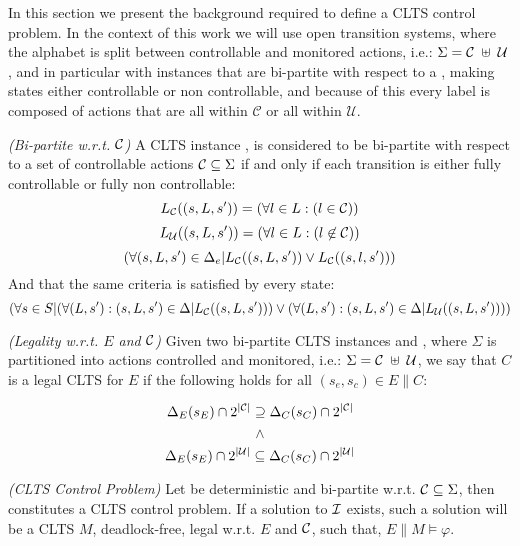 In this section we present the background required to define a CLTS control problem.  In the context of this work we will use open transition systems, where the alphabet is split between controllable and monitored actions, i.e.: $\Sigma=\mathcal{C} \; \uplus \;\mathcal{U}$, and in particular with instances that are bi-partite with respect to a \controlSet, making states either controllable or non controllable, and because of this every label is composed of actions that are all within $\mathcal{C}$ or all within $\mathcal{U}$. 

\begin{definition}\label{def:bi-partite_clts} \emph{(Bi-partite w.r.t. $\mathcal{C}$)} 
A CLTS instance \cltsDef, is considered to be bi-partite with respect to a set of controllable actions $\mathcal{C} \subseteq \Sigma$ if and only if each transition is either fully controllable or fully non controllable:
\[ L_{\mathcal{C}}((s,L,s'))= ( \forall l \in L:(l \in \mathcal{C}))\]
\[ L_{\mathcal{U}}((s,L,s'))= ( \forall l \in L:(l \not\in \mathcal{C}))\]
\[ (\forall (s,L,s') \in \Delta_e| L_{\mathcal{C}}((s,L,s')) \vee L_{\mathcal{C}}((s,l,s'))) \]
And that the same criteria is satisfied by every state:
\[ (\forall s \in S | (\forall (L, s'): (s,L,s') \in \Delta|L_{\mathcal{C}}((s,L,s')))\vee (\forall (L, s'): (s,L,s') \in \Delta|L_{\mathcal{U}}((s,L,s'))))\]
\end{definition}

\begin{definition}
	\label{def:legal_clts} \emph{(Legality w.r.t. $E$ and $\mathcal{C}$)} 
	Given two bi-partite CLTS instances  and , where $\Sigma$ is partitioned into actions controlled and monitored, i.e.: $\Sigma=\mathcal{C} \; \uplus \;\mathcal{U}$, we say that $C$ is a legal CLTS for $E$ if the following holds for all $(s_e,s_c) \in E \parallel C$:
	
	\[ \Delta_{E}(s_E)\cap 2^{|\mathcal{C}|} \supseteq \Delta_{C}(s_C)\cap 2^{|\mathcal{C}|}\] 
	\[\wedge\]
	\[\Delta_{E}(s_E)\cap 2^{|\mathcal{U}|} \subseteq \Delta_{C}(s_C)\cap 2^{|\mathcal{U}|} \]
\end{definition}

\begin{definition}
	\label{def:clts_control_problem} \emph{(CLTS Control Problem)} 
	Let  be deterministic and bi-partite w.r.t. $\mathcal{C} \subseteq \Sigma$, then \controlProblemDef constitutes a CLTS control problem. If a solution to $\mathcal{I}$ exists, such a solution will be a CLTS $M$, deadlock-free, legal w.r.t. $E$ and $\mathcal{C}$, such that, $E \parallel M \models \varphi$.
\end{definition}
